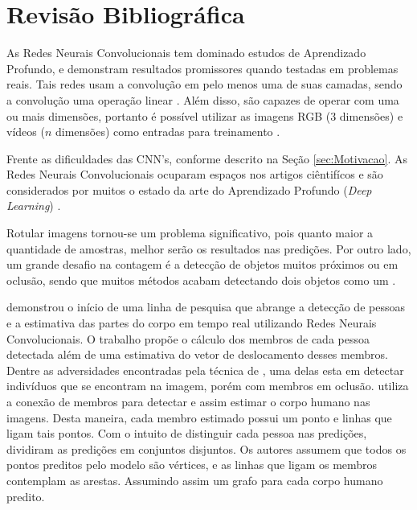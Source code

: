 \chapter{Revisão Bibliográfica}
\label{chap:am}






As Redes Neurais Convolucionais tem dominado estudos de Aprendizado Profundo, e demonstram resultados promissores quando testadas em problemas reais. Tais redes usam a convolução em pelo menos uma de suas camadas, sendo a convolução uma operação linear \cite{deeplearningbook}. Além disso, são capazes de operar com uma ou mais dimensões, portanto é possível utilizar as imagens RGB ($3$ dimensões) e vídeos ($n$ dimensões) como entradas para treinamento \cite{5605630}.





Frente as dificuldades das CNN's, conforme descrito na Seção \ref{sec:Motivacao}. As Redes Neurais Convolucionais ocuparam espaços nos artigos ciêntifícos e são considerados por muitos o estado da arte do Aprendizado Profundo (\textit{Deep Learning})
\cite{DBLP:journals/corr/abs-1904-00889, 8437104, 8489369, rs11010011, 8186148, Zhao2017CVPR,DBLP:journals/corr/CaoSWS16, 8186148,DBLP:journals/corr/CaoSWS16,articleLuiz}.


\label{sec:relatedWork}

Rotular imagens tornou-se um problema significativo, pois quanto maior a quantidade de amostras, melhor serão os resultados nas predições.
Por outro lado, um grande desafio na contagem é a detecção de objetos muitos próximos ou em oclusão, sendo que muitos métodos acabam detectando dois objetos como um \cite{article,8451787,inproceedings, DBLP:journals/corr/abs-1711-04433, 8489369, 8127090, s17040905, DBLP:journals/corr/abs-1804-00307, articleLuiz,DBLP:journals/corr/CheangCT17a}.

\cite{Cao2017} demonstrou o início de uma linha de pesquisa que abrange a detecção de pessoas e a estimativa das partes do corpo em tempo real utilizando Redes Neurais Convolucionais. O trabalho propõe o cálculo dos membros de cada pessoa detectada além de uma estimativa do vetor de deslocamento desses membros.
Dentre as adversidades encontradas pela técnica de \cite{Cao2017}, uma delas esta em detectar indivíduos que se encontram na imagem, porém com membros em oclusão. \cite{Cao2017} utiliza a conexão de membros para detectar e assim estimar o corpo humano nas imagens. Desta maneira,  cada membro estimado possui um ponto e linhas que ligam tais pontos.
Com o intuito de distinguir cada pessoa nas predições, \cite{Cao2017} dividiram as predições em conjuntos disjuntos.
Os autores assumem que todos os pontos preditos pelo modelo são vértices, e as linhas que ligam os membros contemplam as arestas. Assumindo assim um grafo para cada corpo humano predito.

